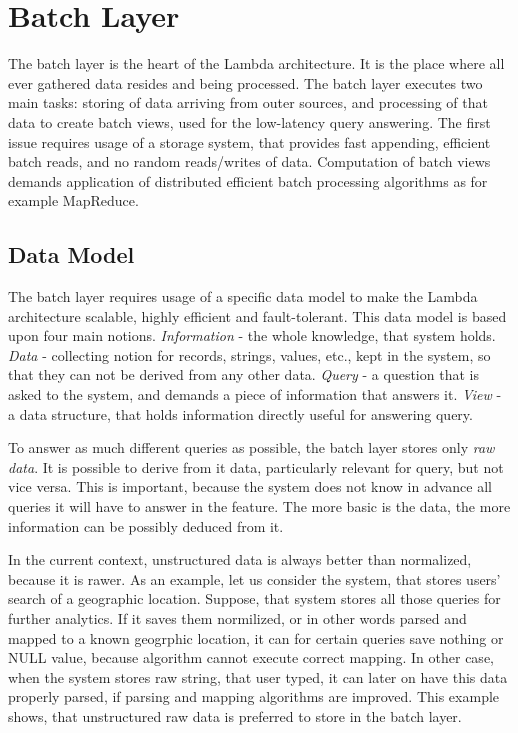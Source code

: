 \section{Batch Layer}

The batch layer is the heart of the Lambda architecture.
It is the place where all ever gathered data resides and being processed.
The batch layer executes two main tasks: storing of data arriving from outer sources, and processing of that data to create batch views, used for the low-latency query answering.
The first issue requires usage of a storage system, that provides fast appending, efficient batch reads, and no random reads/writes of data.
Computation of batch views demands application of distributed efficient batch processing algorithms as for example MapReduce.

\subsection{Data Model}

The batch layer requires usage of a specific data model to make the Lambda architecture scalable, highly efficient and fault-tolerant.
This data model is based upon four main notions.
\textit{Information} - the whole knowledge, that system holds.
\textit{Data} - collecting notion for records, strings, values, etc., kept in the system, so that they can not be derived from any other data.
\textit{Query} - a question that is asked to the system, and demands a piece of information that answers it.
\textit{View} - a data structure, that holds information directly useful for answering query.

To answer as much different queries as possible, the batch layer stores only \textit{raw data}.
It is possible to derive from it data, particularly relevant for query, but not vice versa.
This is important, because the system does not know in advance all queries it will have to answer in the feature.
The more basic is the data, the more information can be possibly deduced from it.

In the current context, unstructured data is always better than normalized, because it is rawer.
As an example, let us consider the system, that stores users' search of a geographic location.
Suppose, that system stores all those queries for further analytics.
If it saves them normilized, or in other words parsed and mapped to a known geogrphic location, it can for certain queries save nothing or NULL value, because algorithm cannot execute correct mapping.
In other case, when the system stores raw string, that user typed, it can later on have this data properly parsed, if parsing and mapping algorithms are improved.
This example shows, that unstructured raw data is preferred to store in the batch layer.

